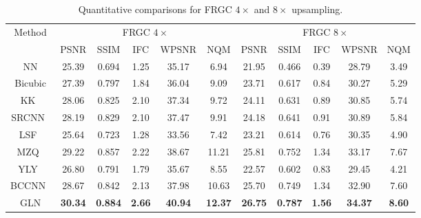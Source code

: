 \documentclass[runningheads]{llncs}
\begin{document}
\begin{table}[t]
\centering
\small
\caption{Quantitative comparisons for FRGC $4\times$ and $8\times$ upsampling.}
\vspace{-4mm}
\label{tab:MetricsFRGC}
\begin{tabular}[t]{|c||c|c|c|c|c||c|c|c|c|c|}
\hline
Method & \multicolumn{5}{|c||}{FRGC $4\times$} & \multicolumn{5}{|c|}{FRGC $8\times$}\\
\cline{2-11}
 & PSNR & SSIM & IFC & WPSNR & NQM & PSNR & SSIM & IFC & WPSNR & NQM \\
\hline

NN                        & 25.39 & 0.694 & 1.25 & 35.17 & 6.94 & 21.95 & 0.466 & 0.39 & 28.79 & 3.49\\
\hline
Bicubic                   & 27.39 & 0.797 & 1.84 & 36.04 & 9.09 & 23.71 & 0.617 & 0.84 & 30.27 & 5.29\\
\hline
KK~\cite{Kim10PAMI}       & 28.06 & 0.825 & 2.10 & 37.34 & 9.72 & 24.11 & 0.631 & 0.89 & 30.85 & 5.74\\
\hline
SRCNN~\cite{Dong15PAMI}   & 28.19 & 0.829 & 2.10 & 37.47 & 9.91 & 24.18 & 0.641 & 0.91 & 30.89 & 5.84\\
\hline
LSF~\cite{Liu07}           & 25.64 & 0.723 & 1.28 & 33.56 & 7.42 & 23.21 & 0.614 & 0.76 & 30.35 & 4.90\\
\hline
MZQ~\cite{Ma10PR}         & 29.22 & 0.857 & 2.22 & 38.67 & 11.21 & 25.81 & 0.752 & 1.34 & 33.17 & 7.67\\
\hline
YLY~\cite{Yang13CVPR}     & 26.80 & 0.791 & 1.79 & 35.67 & 8.55 & 22.57 & 0.602 & 0.83 & 29.45 & 4.21\\
\hline
BCCNN~\cite{Zhou15AAAI}   & 28.67 & 0.842 & 2.13 & 37.98 & 10.63 & 25.70 & 0.749 & 1.34 & 32.90 & 7.60\\
\hline
GLN                       & \bf 30.34 & \bf 0.884 & \bf 2.66 & \bf 40.94 & \bf 12.37 & \bf 26.75 & \bf 0.787 & \bf 1.56 & \bf 34.37 & \bf 8.60\\
\hline


\end{tabular}
\end{table}
\end{document}
